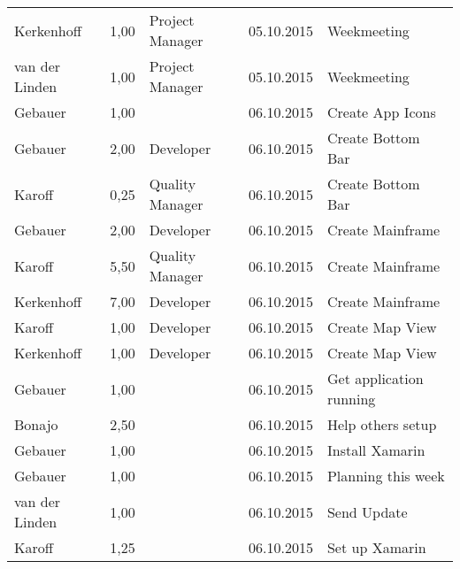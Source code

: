 \begin{longtable}{ l r p{2cm} c p{4cm} }
		Kerkenhoff              & 1,00           & Project Manager & 05.10.2015    & Weekmeeting                                  \\
		van der Linden          & 1,00           & Project Manager & 05.10.2015    & Weekmeeting                                  \\
		Gebauer                 & 1,00           &                 & 06.10.2015    & Create App Icons                             \\
		Gebauer                 & 2,00           & Developer       & 06.10.2015    & Create Bottom Bar                            \\
		Karoff                  & 0,25           & Quality Manager & 06.10.2015    & Create Bottom Bar                            \\
		Gebauer                 & 2,00           & Developer       & 06.10.2015    & Create Mainframe                             \\
		Karoff                  & 5,50           & Quality Manager & 06.10.2015    & Create Mainframe                             \\
		Kerkenhoff              & 7,00           & Developer       & 06.10.2015    & Create Mainframe                             \\
		Karoff                  & 1,00           & Developer       & 06.10.2015    & Create Map View                              \\
		Kerkenhoff              & 1,00           & Developer       & 06.10.2015    & Create Map View                              \\
		Gebauer                 & 1,00           &                 & 06.10.2015    & Get application running                      \\
		Bonajo                  & 2,50           &                 & 06.10.2015    & Help others setup                            \\
		Gebauer                 & 1,00           &                 & 06.10.2015    & Install Xamarin                              \\
		Gebauer                 & 1,00           &                 & 06.10.2015    & Planning this week                           \\
		van der Linden          & 1,00           &                 & 06.10.2015    & Send Update                                  \\
		Karoff                  & 1,25           &                 & 06.10.2015    & Set up Xamarin                               \\

\end{longtable}
